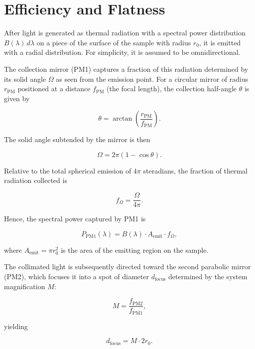 \documentclass[
	parskip=half,
	a4paper,
]{scrarticle}
\begin{document}
\section{Efficiency and Flatness}
After light is generated as thermal radiation with a spectral power distribution $B(\lambda)\, d\lambda$ on a piece of the surface of the sample with radius $r_0$, it is emitted with a radial distribution. For simplicity, it is assumed to be omnidirectional.

The collection mirror (PM1) captures a fraction of this radiation determined by its solid angle $\Omega$ as seen from the emission point. For a circular mirror of radius $r_\text{PM}$ positioned at a distance $f_\text{PM}$ (the focal length), the collection half-angle $\theta$ is given by

\begin{equation}
    \theta = \arctan\left( \frac{r_\text{PM}}{f_\text{PM}} \right).
\end{equation}

The solid angle subtended by the mirror is then

\begin{equation}
    \Omega = 2\pi \left( 1 - \cos \theta \right).
\end{equation}

Relative to the total spherical emission of $4\pi$ steradians, the fraction of thermal radiation collected is

\begin{equation}
    f_\Omega = \frac{\Omega}{4\pi}.
\end{equation}

Hence, the spectral power captured by PM1 is

\begin{equation}
    P_\text{PM1}(\lambda) 
    = B(\lambda) \cdot A_\text{emit} \cdot f_\Omega,
\end{equation}

where $A_\text{emit} = \pi r_0^2$ is the area of the emitting region on the sample.

The collimated light is subsequently directed toward the second parabolic mirror (PM2), which focuses it into a spot of diameter $d_\text{focus}$ determined by the system magnification $M$:

\begin{equation}
    M = \frac{f_\text{PM2}}{f_\text{PM1}},
\end{equation}

yielding

\begin{equation}
    d_\text{focus} = M \cdot 2 r_0.
\end{equation}
\end{document}
